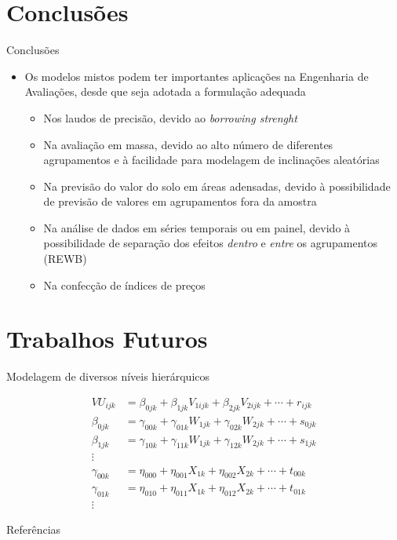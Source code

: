 \documentclass[9pt,ignorenonframetext,aspectratio=169]{beamer}
\newif\ifbibliography
\providecommand{\tightlist}{%
  \setlength{\itemsep}{0pt}\setlength{\parskip}{0pt}}
\begin{document}
\hypertarget{conclusuxf5es}{%
\section{Conclusões}\label{conclusuxf5es}}

\begin{frame}{Conclusões}

\begin{itemize}[<+->]
\tightlist
\item
  \alert<1>{Os modelos mistos podem ter importantes aplicações na Engenharia de
  Avaliações, desde que seja adotada a formulação adequada}

  \begin{itemize}[<+->]
  \tightlist
  \item
    \alert<2>{Nos laudos de precisão, devido ao \emph{borrowing strenght}}
  \item
    \alert<3>{Na avaliação em massa, devido ao alto número de diferentes
    agrupamentos e à facilidade para modelagem de inclinações aleatórias}
  \item
    \alert<4>{Na previsão do valor do solo em áreas adensadas, devido à 
    possibilidade de previsão de valores em agrupamentos fora da amostra}
  \item
    \alert<5>{Na análise de dados em séries temporais ou em painel, devido à
    possibilidade de separação dos efeitos \emph{dentro} e \emph{entre} os 
    agrupamentos (REWB)}
  \item
    \alert<6>{Na confecção de índices de preços}
  \end{itemize}
\end{itemize}

\end{frame}

\hypertarget{trabalhos-futuros}{%
\section{Trabalhos Futuros}\label{trabalhos-futuros}}

\begin{frame}{Modelagem de diversos níveis hierárquicos}
\protect\hypertarget{modelagem-de-diversos-nuxedveis-hieruxe1rquicos}{}

\begin{align*}
VU_{ijk}  &= \beta_{0jk} + \beta_{1jk} V_{1ijk} + \beta_{2jk} V_{2ijk} + \cdots + r_{ijk}\\ 
\beta_{0jk} &= \gamma_{00k} + \gamma_{01k}W_{1jk} + \gamma_{02k}W_{2jk} + \cdots+ s_{0jk}\\ 
\beta_{1jk} &= \gamma_{10k} + \gamma_{11k}W_{1jk} + \gamma_{12k}W_{2jk} + \cdots+ s_{1jk}\\ 
\vdots \\
\gamma_{00k} &= \eta_{000} + \eta_{001} X_{1k} + \eta_{002} X_{2k} + \cdots +  t_{00k}\\ 
\gamma_{01k} &= \eta_{010} + \eta_{011} X_{1k} + \eta_{012} X_{2k} + \cdots +  t_{01k}\\ 
\vdots
\end{align*}

\end{frame}


  \begin{frame}[allowframebreaks]{Referências}
  \bibliographytrue
  \printbibliography[heading=none]
  \end{frame}
\end{document}
